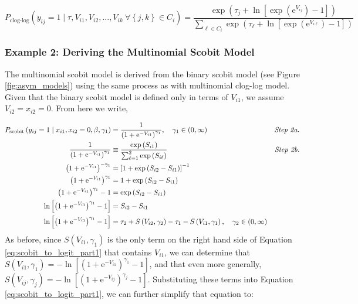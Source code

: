 \begin{equation*}
P_{\textrm{clog-log}} \left( y_{ij} = 1 \mid \tau, V_{i1}, V_{i2}, ..., V_{ik} \ \forall \left\lbrace j, k \right\rbrace \in C_i \right) = \frac{\exp \left( \tau _j + \ln \left[ \exp \left( \mathrm{e}^{V_{ij}} \right) - 1 \right] \right)}{ \sum _{\ell \in C_i} \exp \left( \tau _{\ell} + \ln \left[ \exp \left( \mathrm{e}^{V_{i \ell}} \right) - 1 \right] \right)}
\end{equation*}

\subsubsection{Example 2: Deriving the Multinomial Scobit Model}
\label{sec:deriving_multinomial_scobit}

The multinomial scobit model is derived from the binary scobit model (see Figure \ref{fig:asym_models}) using the same process as with multinomial clog-log model. Given that the binary scobit model \citep{nagler_scobit:_1994} is defined only in terms of $V_{i1}$, we assume $V_{i2} = x_{i2} = 0$. From here we write,


\begin{equation}
\label{eq:scobit_to_logit_part1}
\begin{aligned}
P_{\textrm{scobit}} \left( y_{ij} = 1 \mid x_{i1}, x_{i2} = 0, \beta, \gamma _1 \right) &= \frac{1}{\left( 1 + \mathrm{e}^{- V_{i1}} \right)^ {\gamma _1}}, \quad \gamma_1 \in \left( 0, \infty \right) \qquad &\textrm{\textit{Step 2a.}} \\ 
\frac{1}{\left( 1 + \mathrm{e}^{- V_{i1}} \right)^ {\gamma _1}} &\equiv \frac{\exp \left( S_{i1} \right)}{\sum _{\ell = 1} ^2 \exp \left( S_{i \ell} \right)} \qquad &\textrm{\textit{Step 2b.}}\\
\left( 1 + \mathrm{e}^{- V_{i1}} \right)^ {- \gamma _1} &= \left[ 1 + \exp \left( S_{i2} - S_{i1} \right) \right]^{-1} \\
\left( 1 + \mathrm{e}^{- V_{i1}} \right)^ {\gamma _1} &= 1 + \exp \left( S_{i2} - S_{i1} \right) \\
\left( 1 + \mathrm{e}^{- V_{i1}} \right)^ {\gamma _1} - 1 &=  \exp \left( S_{i2} - S_{i1} \right) \\
\ln \left[ \left( 1 + \mathrm{e}^{- V_{i1}} \right)^ {\gamma _1} - 1 \right] &= S_{i2} - S_{i1} \\
\ln \left[ \left( 1 + \mathrm{e}^{- V_{i1}} \right)^ {\gamma _1} - 1 \right] &= \tau_2 + S \left( V_{i2}, \gamma_2 \right) - \tau_1 - S \left( V_{i1}, \gamma_1 \right), \quad \gamma_2 \in \left( 0, \infty \right)
\end{aligned}
\end{equation}
As before, since $S \left( V_{i1} , \gamma_1\right)$ is the only term on the right hand side of Equation \ref{eq:scobit_to_logit_part1} that contains $V_{i1}$, we can determine that $S \left( V_{i1}, \gamma_1 \right) = - \ln \left[ \left( 1 + \mathrm{e}^{- V_{i1}} \right)^ {\gamma _1} - 1 \right] $, and that even more generally, $S \left( V_{ij}, \gamma_j \right) = - \ln \left[ \left( 1 + \mathrm{e}^{- V_{ij}} \right)^ {\gamma _j} - 1 \right]$. Substituting these terms into Equation \ref{eq:scobit_to_logit_part1}, we can further simplify that equation to:

